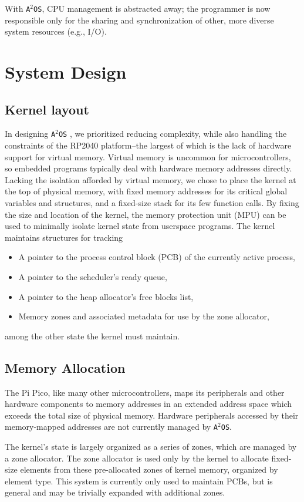 \documentclass[12pt]{article}
\newcommand{\os}{\texttt{A$^2$OS} }
\newcommand{\osns}{\texttt{A$^2$OS}}
\begin{document}
With \osns, CPU management is abstracted away; the programmer is now responsible
only for the sharing and synchronization of other, more diverse system
resources (e.g., I/O).


\section{System Design}
\subsection{Kernel layout}
In designing \os, we prioritized reducing complexity, while also handling the
constraints of the RP2040 platform--the largest of which is the lack of hardware
support for virtual memory. Virtual memory is uncommon for microcontrollers, so
embedded programs typically deal with hardware memory addresses directly.
Lacking the isolation afforded by virtual memory, we chose to place the kernel
at the top of physical memory, with fixed memory addresses for its critical
global variables and structures, and a fixed-size stack for its few function
calls. By fixing the size and location of the kernel, the memory protection unit
(MPU) can be used to minimally isolate kernel state from userspace programs. The
kernel maintains structures for tracking
\begin{itemize}
    \item {A pointer to the process control block (PCB) of the currently active
    process,}
    \item A pointer to the scheduler's ready queue,
    \item A pointer to the heap allocator's free blocks list,
    \item Memory zones and associated metadata for use by the zone allocator,
\end{itemize}
among the other state the kernel must maintain.

\subsection{Memory Allocation}
The Pi Pico, like many other microcontrollers, maps its peripherals and other
hardware components to memory addresses in an extended address space which
exceeds the total size of physical memory. Hardware peripherals accessed by
their memory-mapped addresses are not currently managed by \osns.

The kernel's state is largely organized as a series of zones, which are managed
by a zone allocator. The zone allocator is used only by the kernel to allocate
fixed-size elements from these pre-allocated zones of kernel memory, organized
by element type. This system is currently only used to maintain PCBs, but is
general and may be trivially expanded with additional zones.
\end{document}
